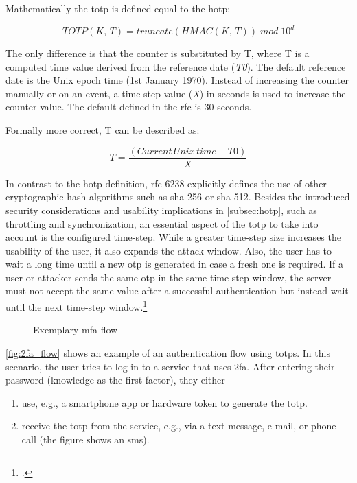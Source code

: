 Mathematically the \gls{totp} is defined equal to the \gls{hotp}:

\begin{equation*}
	TOTP(K,\, T) = truncate(HMAC(K,\, T))\; mod \; 10^d
\end{equation*}

The only difference is that the counter is substituted by T, where T is a computed time value derived from the reference date (\textit{T0}). The default reference date is the Unix epoch time (1st January 1970). Instead of increasing the counter manually or on an event, a time-step value (\textit{X}) in seconds is used to increase the counter value. The default defined in the \gls{rfc} is 30 seconds.

Formally more correct, T can be described as:

\begin{equation*}
	T = \frac{(Current\, Unix\, time - T0)}{X}
\end{equation*}

In contrast to the \gls{hotp} definition, \gls{rfc} 6238 explicitly defines the use of other cryptographic hash algorithms such as \gls{sha}-256 or \gls{sha}-512. Besides the introduced security considerations and usability implications in \autoref{subsec:hotp}, such as throttling and synchronization, an essential aspect of the \gls{totp} to take into account is the configured time-step. While a greater time-step size increases the usability of the user, it also expands the attack window. Also, the user has to wait a long time until a new \gls{otp} is generated in case a fresh one is required. If a user or attacker sends the same \gls{otp} in the same time-step window, the server must not accept the same value after a successful authentication but instead wait until the next time-step window.\footcite[See][6]{m2011rfc}

\begin{figure}[hbt]
	\centering
	
	\caption[Exemplary \gls{mfa} flow]{Exemplary \gls{mfa} flow\footnotemark}
	\label{fig:2fa_flow}
\end{figure}

\autoref{fig:2fa_flow} shows an example of an authentication flow using \glspl{totp}. In this scenario, the user tries to log in to a service that uses \gls{2fa}. After entering their password (knowledge as the first factor), they either

\begin{enumerate}[label=(\alph*)]
	\item use, e.g., a smartphone app or hardware token to generate the \gls{totp}.
	\item receive the \gls{totp} from the service, e.g., via a text message, e-mail, or phone call (the figure shows an \gls{sms}).
\end{enumerate}

